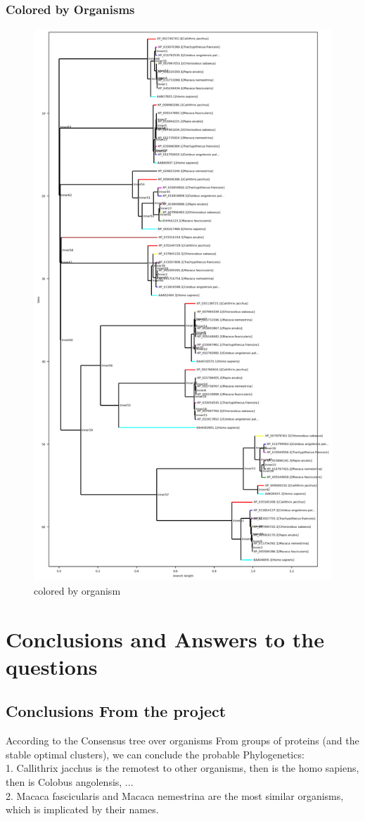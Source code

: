\documentclass[a4paper, 12pt, one column]{article}
\begin{document}
\subsubsection{Colored by Organisms}
\begin{figure}[H]
    \centering
    \includegraphics[width=.6\linewidth]{colored_organism.png}
    \caption{colored by organism}
    \label{fig:colored_organism}
\end{figure}

\section{Conclusions and Answers to the questions}
\subsection{Conclusions From the project}
According to the Consensus tree over organisms From groups of proteins (and the stable optimal clusters), we can conclude the probable Phylogenetics:\\
1. Callithrix jacchus is the remotest to other organisms, then is the homo sapiens, then is Colobus angolensis, ...  \\ 
2. Macaca fascicularis and Macaca nemestrina are the most similar organisms, which is implicated by their names. \\
\end{document}
